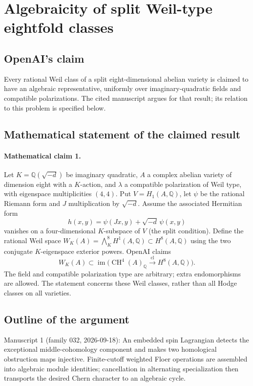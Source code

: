 \documentclass[11pt]{article}
\begin{document}
\section*{Algebraicity of split Weil-type eightfold classes}

\subsection{OpenAI's claim}
Every rational Weil class of a split eight-dimensional abelian variety is claimed to have an algebraic representative, uniformly over imaginary-quadratic fields and compatible polarizations. The cited manuscript argues for that result; its relation to this problem is specified below.

\subsection{Mathematical statement of the claimed result}
\paragraph{Mathematical claim 1.} Let $K=\mathbb Q(\sqrt{-d})$ be imaginary quadratic, $A$ a complex abelian variety of dimension eight with a $K$-action, and $\lambda$ a compatible polarization of Weil type, with eigenspace multiplicities $(4,4)$. Put $V=H_1(A,\mathbb Q)$, let $\psi$ be the rational Riemann form and $J$ multiplication by $\sqrt{-d}$. Assume the associated Hermitian form
\[
h(x,y)=\psi(Jx,y)+\sqrt{-d}\,\psi(x,y)
\]
vanishes on a four-dimensional $K$-subspace of $V$ (the split condition). Define the rational Weil space $W_K(A)=\bigwedge_K^8H^1(A,\mathbb Q)\subset H^8(A,\mathbb Q)$ using the two conjugate $K$-eigenspace exterior powers. OpenAI claims
\[
W_K(A)\subset\operatorname{im}\bigl(\operatorname{CH}^4(A)_{\mathbb Q}\xrightarrow{\operatorname{cl}}H^8(A,\mathbb Q)\bigr).
\]
The field and compatible polarization type are arbitrary; extra endomorphisms are allowed. The statement concerns these Weil classes, rather than all Hodge classes on all varieties.

\subsection{Outline of the argument}
Manuscript 1 (family 032, 2026-09-18): An embedded spin Lagrangian detects the exceptional middle-cohomology component and makes two homological obstruction maps injective. Finite-cutoff weighted Floer operations are assembled into algebraic module identities; cancellation in alternating specialization then transports the desired Chern character to an algebraic cycle.
\end{document}
